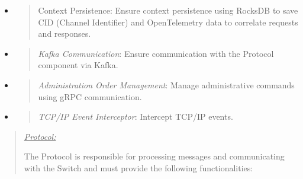 \documentclass[12pt,a4paper]{report}
\begin{document}
\begin{itemize}
\begin{quote}
  \end{quote}
\item
  \begin{quote}
  Context Persistence: Ensure context persistence using RocksDB to save
  CID (Channel Identifier) \hspace{0pt}\hspace{0pt}and OpenTelemetry
  data to correlate requests and responses.
  \end{quote}
\item
  \begin{quote}
  \emph{Kafka Communication}: Ensure communication with the Protocol
  component via Kafka.
  \end{quote}
\item
  \begin{quote}
  \emph{Administration Order Management}: Manage administrative commands
  using gRPC communication.
  \end{quote}
\item
  \begin{quote}
  \emph{TCP/IP Event Interceptor}: Intercept TCP/IP events.
  \end{quote}
\end{itemize}

\begin{quote}
\emph{\uline{Protocol:}}

The Protocol is responsible for processing messages and communicating
with the Switch and must provide the following functionalities:
\end{quote}
\end{document}
